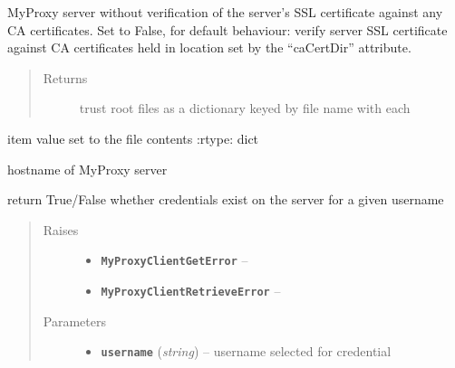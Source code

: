 \documentclass[letterpaper,10pt,english]{sphinxmanual}
\begin{document}
\begin{fulllineitems}
\begin{fulllineitems}
\begin{quote}
\begin{description}
\end{description}\end{quote}

MyProxy server without verification of the server's SSL certificate
against any CA certificates.  Set to False, for default behaviour:
verify server SSL certificate against CA certificates held in location
set by the ``caCertDir'' attribute.
\begin{quote}\begin{description}
\item[{Returns}] \leavevmode
trust root files as a dictionary keyed by file name with each

\end{description}\end{quote}

item value set to the file contents
:rtype: dict

\end{fulllineitems}


\begin{fulllineitems}
\label{client:myproxy.client.MyProxyClient.hostname}
hostname of MyProxy server

\end{fulllineitems}


\begin{fulllineitems}
\label{client:myproxy.client.MyProxyClient.info}
return True/False whether credentials exist on the server for a 
given username
\begin{quote}\begin{description}
\item[{Raises}] \leavevmode\begin{itemize}
\item {} 
\textbf{\texttt{MyProxyClientGetError}} -- 

\item {} 
\textbf{\texttt{MyProxyClientRetrieveError}} -- 

\end{itemize}

\item[{Parameters}] \leavevmode\begin{itemize}
\item {} 
\textbf{\texttt{username}} (\emph{string}) -- username selected for credential


\end{itemize}
\end{description}
\end{quote}
\end{fulllineitems}
\end{fulllineitems}
\end{document}
